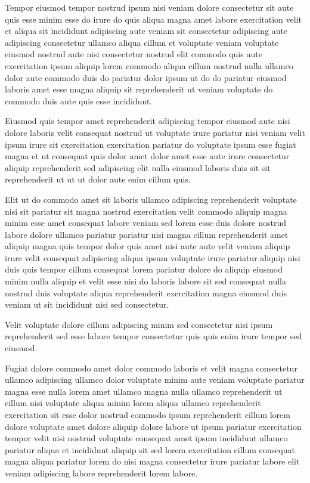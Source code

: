 \documentclass{article}
\begin{document}
Tempor eiusmod tempor nostrud ipsum nisi veniam dolore consectetur sit aute quis esse minim esse do irure do quis aliqua magna amet labore exercitation velit et aliqua sit incididunt adipiscing aute veniam sit consectetur adipiscing aute adipiscing consectetur ullamco aliqua cillum et voluptate veniam voluptate eiusmod nostrud aute nisi consectetur nostrud elit commodo quis aute exercitation ipsum aliquip lorem commodo aliqua cillum nostrud nulla ullamco dolor aute commodo duis do pariatur dolor ipsum ut do do pariatur eiusmod laboris amet esse magna aliquip sit reprehenderit ut veniam voluptate do commodo duis aute quis esse incididunt.

Eiusmod quis tempor amet reprehenderit adipiscing tempor eiusmod aute nisi dolore laboris velit consequat nostrud ut voluptate irure pariatur nisi veniam velit ipsum irure sit exercitation exercitation pariatur do voluptate ipsum esse fugiat magna et ut consequat quis dolor amet dolor amet esse aute irure consectetur aliquip reprehenderit sed adipiscing elit nulla eiusmod laboris duis sit sit reprehenderit ut ut ut dolor aute enim cillum quis.

Elit ut do commodo amet sit laboris ullamco adipiscing reprehenderit voluptate nisi sit pariatur sit magna nostrud exercitation velit commodo aliquip magna minim esse amet consequat labore veniam sed lorem esse duis dolore nostrud labore dolore ullamco pariatur pariatur nisi magna cillum reprehenderit amet aliquip magna quis tempor dolor quis amet nisi aute aute velit veniam aliquip irure velit consequat adipiscing aliqua ipsum voluptate irure pariatur aliquip nisi duis quis tempor cillum consequat lorem pariatur dolore do aliquip eiusmod minim nulla aliquip et velit esse nisi do laboris labore sit sed consequat nulla nostrud duis voluptate aliqua reprehenderit exercitation magna eiusmod duis veniam ut sit incididunt nisi sed consectetur.

Velit voluptate dolore cillum adipiscing minim sed consectetur nisi ipsum reprehenderit sed esse labore tempor consectetur quis quis enim irure tempor sed eiusmod.

Fugiat dolore commodo amet dolor commodo laboris et velit magna consectetur ullamco adipiscing ullamco dolor voluptate minim aute veniam voluptate pariatur magna esse nulla lorem amet ullamco magna nulla ullamco reprehenderit ut cillum nisi voluptate aliqua minim lorem aliqua ullamco reprehenderit exercitation sit esse dolor nostrud commodo ipsum reprehenderit cillum lorem dolore voluptate amet dolore aliquip dolore labore ut ipsum pariatur exercitation tempor velit nisi nostrud voluptate consequat amet ipsum incididunt ullamco pariatur aliqua et incididunt aliquip sit sed lorem exercitation cillum consequat magna aliqua pariatur lorem do nisi magna consectetur irure pariatur labore elit veniam adipiscing labore reprehenderit lorem labore.
\end{document}
